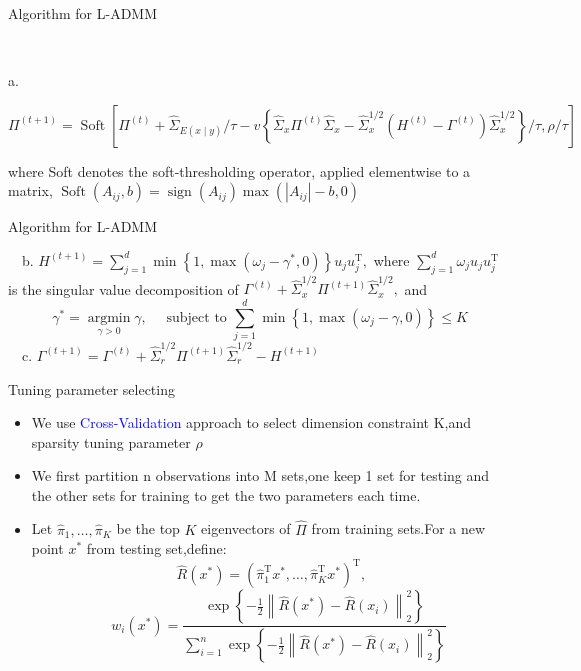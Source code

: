 \documentclass{beamer}
\begin{document}
\begin{frame}{Algorithm for L-ADMM}
\begin{algorithm}[H]
 \\
{\　a. \begin{tiny}$\Pi^{(t+1)}=\operatorname{Soft}\left[\Pi^{(t)}+\hat{\Sigma}_{E(x \mid y)} / \tau-v\left\{\hat{\Sigma}_{x} \Pi^{(t)} \hat{\Sigma}_{x}-\hat{\Sigma}_{x}^{1 / 2}\left(H^{(t)}-\Gamma^{(t)}\right) \hat{\Sigma}_{x}^{1 / 2}\right\} / \tau, \rho / \tau\right]$\end{tiny}
where Soft denotes the soft-thresholding operator, applied elementwise to a matrix, $\operatorname{Soft}\left(A_{i j}, b\right)=\operatorname{sign}\left(A_{i j}\right) \max \left(\left|A_{i j}\right|-b, 0\right)$ \;

}


\end{algorithm}

\end{frame}


\begin{frame}{Algorithm for L-ADMM}
\begin{algorithm}[H]
$ \quad $b. $H^{(t+1)}=\sum_{j=1}^{d} \min \left\{1, \max \left(\omega_{j}-\gamma^{*}, 0\right)\right\} u_{j} u_{j}^{\mathrm{T}},$ where $\sum_{j=1}^{d} \omega_{j} u_{j} u_{j}^{\mathrm{T}}$ is the singular value
decomposition of $\Gamma^{(t)}+\hat{\Sigma}_{x}^{1 / 2} \Pi^{(t+1)} \hat{\Sigma}_{x}^{1 / 2},$ and
$$
\gamma^{*}=\underset{\gamma>0}{\operatorname{argmin}} \gamma, \quad \text { subject to } \sum_{j=1}^{d} \min \left\{1, \max \left(\omega_{j}-\gamma, 0\right)\right\} \leqslant K
$$
$\quad $c. $\Gamma^{(t+1)}=\Gamma^{(t)}+\hat{\Sigma}_{r}^{1 / 2} \Pi^{(t+1)} \hat{\Sigma}_{r}^{1 / 2}-H^{(t+1)}$
\end{algorithm}
\end{frame}

\begin{frame}{Tuning parameter selecting}
    \begin{itemize}
        \item We use \textcolor{blue}{Cross-Validation} approach to select dimension constraint K,and sparsity tuning parameter $\rho$
        \item We first partition n observations into M sets,one keep 1 set for testing and the other sets for training to get the two parameters each time.
        \item Let $\hat{\pi}_{1}, \ldots, \hat{\pi}_{K}$ be the top $K$ eigenvectors of $\hat{\Pi}$ from training sets.For a new point $x^{*}$ from testing set,define:
        $$\hat{R}\left(x^{*}\right)=\left(\hat{\pi}_{1}^{\mathrm{T}} x^{*}, \ldots, \hat{\pi}_{K}^{\mathrm{T}} x^{*}\right)^{\mathrm{T}}, $$ 
        $$\quad w_{i}\left(x^{*}\right)=\frac{\exp \left\{-\frac{1}{2}\left\|\hat{R}\left(x^{*}\right)-\hat{R}\left(x_{i}\right)\right\|_{2}^{2}\right\}}{\sum_{i=1}^{n} \exp \left\{-\frac{1}{2}\left\|\hat{R}\left(x^{*}\right)-\hat{R}\left(x_{i}\right)\right\|_{2}^{2}\right\}}$$
    \end{itemize}
    
\end{frame}
\end{document}

